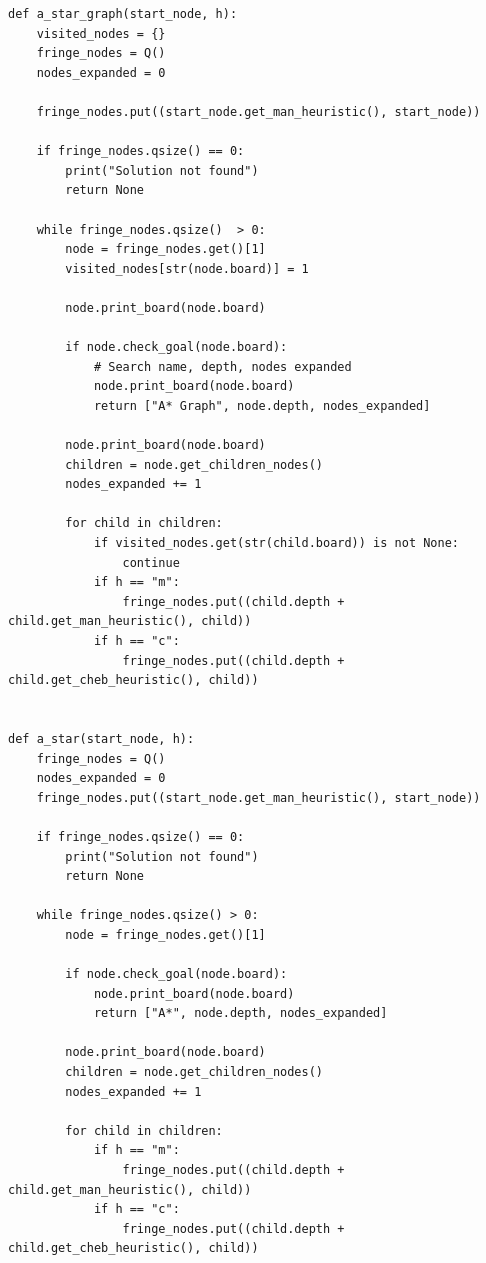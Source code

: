\documentclass[10pt]{article}
\begin{document}
\begin{lstlisting}
def a_star_graph(start_node, h):
    visited_nodes = {}
    fringe_nodes = Q()
    nodes_expanded = 0

    fringe_nodes.put((start_node.get_man_heuristic(), start_node))

    if fringe_nodes.qsize() == 0:
        print("Solution not found")
        return None
    
    while fringe_nodes.qsize()  > 0:
        node = fringe_nodes.get()[1]
        visited_nodes[str(node.board)] = 1
        
        node.print_board(node.board)

        if node.check_goal(node.board):
            # Search name, depth, nodes expanded
            node.print_board(node.board)
            return ["A* Graph", node.depth, nodes_expanded]
        
        node.print_board(node.board)
        children = node.get_children_nodes()
        nodes_expanded += 1

        for child in children:
            if visited_nodes.get(str(child.board)) is not None:
                continue
            if h == "m":
                fringe_nodes.put((child.depth + child.get_man_heuristic(), child))
            if h == "c":
                fringe_nodes.put((child.depth + child.get_cheb_heuristic(), child))
    

def a_star(start_node, h):
    fringe_nodes = Q()
    nodes_expanded = 0
    fringe_nodes.put((start_node.get_man_heuristic(), start_node))

    if fringe_nodes.qsize() == 0:
        print("Solution not found")
        return None
    
    while fringe_nodes.qsize() > 0:
        node = fringe_nodes.get()[1]

        if node.check_goal(node.board):
            node.print_board(node.board)
            return ["A*", node.depth, nodes_expanded]
    
        node.print_board(node.board)
        children = node.get_children_nodes()
        nodes_expanded += 1

        for child in children:
            if h == "m":
                fringe_nodes.put((child.depth + child.get_man_heuristic(), child))
            if h == "c":
                fringe_nodes.put((child.depth + child.get_cheb_heuristic(), child))
   
  \end{lstlisting}
\end{document}
